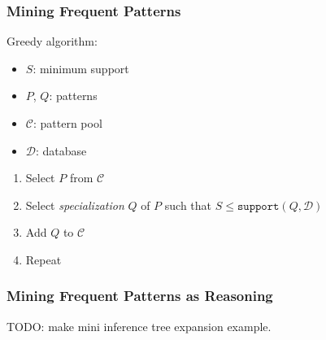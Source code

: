 \documentclass{beamer}
\begin{document}
\begin{frame}
  \frametitle{Mining Frequent Patterns}

  Greedy algorithm:
  \begin{itemize}
  \item $S$: minimum support
  \item $P$, $Q$: patterns
  \item $\mathcal{C}$: pattern pool
  \item $\mathcal{D}$: database
  \end{itemize}
  
  \begin{enumerate}
  \item Select $P$ from $\mathcal{C}$
  \item Select \emph{specialization} $Q$ of $P$ such that $S \leq
    \texttt{support}(Q, \mathcal{D})$
  \item Add $Q$ to $\mathcal{C}$
  \item Repeat
  \end{enumerate}

\end{frame}

\begin{frame}
  \frametitle{Mining Frequent Patterns as Reasoning}

  \begin{prooftree}
  \end{prooftree}

  TODO: make mini inference tree expansion example.

\end{frame}
\end{document}
